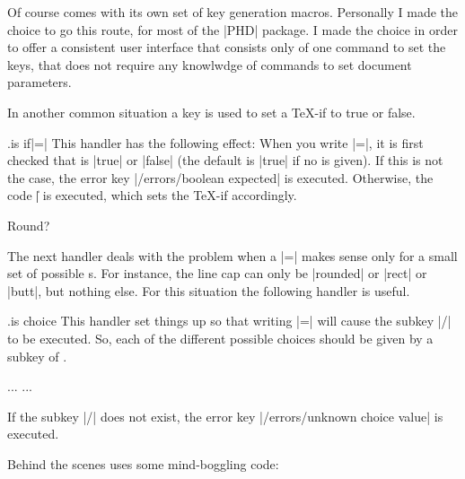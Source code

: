 Of course \latexe comes with its own set of key generation macros. Personally I made the choice to go this route, for most of the
|PHD| package. I made the choice in order to offer a consistent user interface that consists only of one command to set the keys,
that does not require any knowlwdge of \latexe commands to set document parameters.


In another common situation a key is used to set a \TeX-if to true or
false. 

\begin{handler}{.is if}{|=|}
  This handler has the following effect: When you write
  |=|, it is first checked that  is
  |true| or |false| (the default is |true| if no  is
  given). If this is not the case, the error key
  |/errors/boolean expected| is executed. Otherwise, 
  the code |\| is executed, which sets
  the \TeX-if accordingly.
\end{handler}  
\begin{codeexample}[]
\newif\iftheworldisflat    
{}
\iftheworldisflat
  Flat
\else
  Round?
\fi
\end{codeexample}


The next handler deals with the problem when a
|=| makes sense only for a small set of possible
s. For instance, the line cap can only be |rounded| or
|rect| or |butt|, but nothing else. For this situation the following
handler is useful.

\begin{handler}{.is choice}{}
  This handler set things up so that writing |=|
  will cause the subkey |/| to be executed. So,
  each of the different possible choices should be given by a subkey
  of .
\end{handler}  
\begin{codeexample}
...
\draw [/line cap=butt] ...
\end{codeexample}
  If the subkey |/| does not exist, the error
  key |/errors/unknown choice value| is executed.

Behind the scenes \pgfname uses some mind-boggling code:


